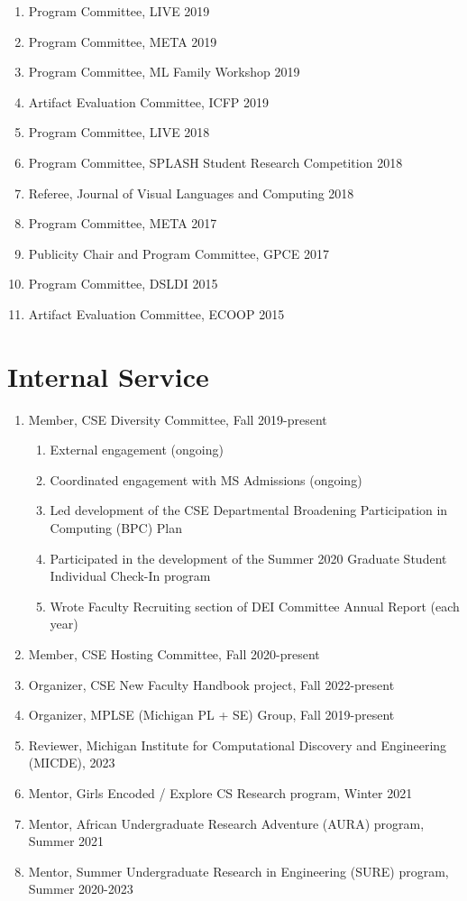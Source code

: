 \documentclass[10pt,letterpaper]{article}
\begin{document}
\begin{enumerate}
  \item Program Committee, LIVE 2019
  \item Program Committee, META 2019
  \item Program Committee, ML Family Workshop 2019
  \item Artifact Evaluation Committee, ICFP 2019
  \item Program Committee, LIVE 2018
  \item Program Committee, SPLASH Student Research Competition 2018
  \item Referee, Journal of Visual Languages and Computing 2018
  \item Program Committee, META 2017
  \item Publicity Chair and Program Committee, GPCE 2017
  \item Program Committee, DSLDI 2015
  \item Artifact Evaluation Committee, ECOOP 2015
\end{enumerate}

\section*{Internal Service}
\begin{enumerate}
  \item Member, CSE Diversity Committee, Fall 2019-present
        \begin{enumerate}
          \item External engagement (ongoing)
          \item Coordinated engagement with MS Admissions (ongoing)
          \item Led development of the CSE Departmental Broadening Participation in Computing (BPC) Plan
          \item Participated in the development of the Summer 2020 Graduate Student Individual Check-In program
          \item Wrote Faculty Recruiting section of DEI Committee Annual Report (each year)
        \end{enumerate}
  \item Member, CSE Hosting Committee, Fall 2020-present
  \item Organizer, CSE New Faculty Handbook project, Fall 2022-present
  \item Organizer, MPLSE (Michigan PL + SE) Group, Fall 2019-present
  \item Reviewer, Michigan Institute for Computational Discovery and Engineering (MICDE), 2023
  \item Mentor, Girls Encoded / Explore CS Research program, Winter 2021
  \item Mentor, African Undergraduate Research Adventure (AURA) program, Summer 2021
  \item Mentor, Summer Undergraduate Research in Engineering (SURE) program, Summer 2020-2023
\end{enumerate}
\end{document}
